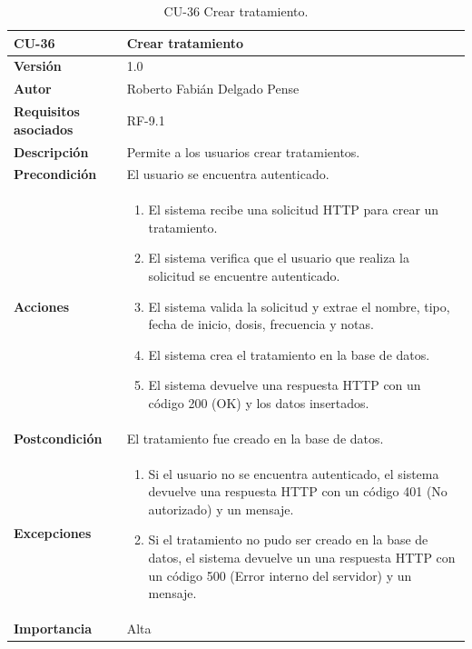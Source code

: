 \begin{table}[p]
	\centering
	\begin{tabularx}{\linewidth}{ p{} p{} }
		\toprule
		\textbf{CU-36}    & \textbf{Crear tratamiento}\\
		\toprule
		\textbf{Versión}              & 1.0    \\
		\textbf{Autor}                & Roberto Fabián Delgado Pense \\
		\textbf{Requisitos asociados} & RF-9.1 \\ 
		\textbf{Descripción}          & Permite a los usuarios crear tratamientos. \\
		\textbf{Precondición}         & El usuario se encuentra autenticado. \\
		\textbf{Acciones}             &
		\begin{enumerate}
			\def\labelenumi{\arabic{enumi}.}
			\tightlist
			\item El sistema recibe una solicitud HTTP para crear un tratamiento.
                \item El sistema verifica que el usuario que realiza la solicitud se encuentre autenticado.
                \item El sistema valida la solicitud y extrae el nombre, tipo, fecha de inicio, dosis, frecuencia y notas.
                \item El sistema crea el tratamiento en la base de datos.
                \item El sistema devuelve una respuesta HTTP con un código 200 (OK) y los datos insertados.         
            \end{enumerate}\\
		\textbf{Postcondición}        & El tratamiento fue creado en la base de datos. \\
		\textbf{Excepciones}          & 
              \begin{enumerate}
			\def\labelenumi{\arabic{enumi}.}
			\tightlist
   			\item Si el usuario no se encuentra autenticado, el sistema devuelve una respuesta HTTP con un código 401 (No autorizado) y un mensaje.
                \item   Si el tratamiento no pudo ser creado en la base de datos, el sistema devuelve un                           una respuesta HTTP con un código 500 (Error interno del servidor) y un mensaje. 
            \end{enumerate}\\
		\textbf{Importancia}          & Alta \\
		\bottomrule
	\end{tabularx}
	\caption{CU-36 Crear tratamiento.}
\end{table}

